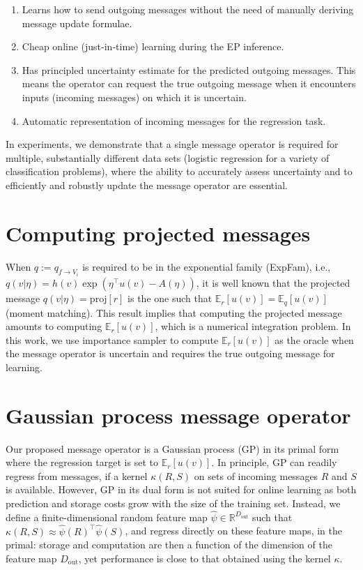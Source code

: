 \documentclass[a4paper,10pt]{article}
\begin{document}
\begin{enumerate}
    \item Learns how to send outgoing messages without the need of manually
        deriving message update formulae.
    \item Cheap online (just-in-time) learning during the EP inference.
    \item Has principled uncertainty estimate for the predicted outgoing
    messages.  This means the operator can request the true outgoing message
when it encounters inputs (incoming messages) on which it is uncertain.  
    \item Automatic representation of incoming messages for the regression task.
\end{enumerate}

In experiments, we demonstrate that a single message operator is required for
multiple, substantially different data sets (logistic regression for a variety
of classification problems), where the ability to accurately assess uncertainty
and to efficiently and robustly update the message operator are essential.

\section{Computing projected messages}
When $q := q_{f \rightarrow V_i}$ is  required to be in the exponential family
(ExpFam), i.e., $q(v|\eta) = h(v)\exp(\eta^\top u(v) - A(\eta))$, 
it is well known that the projected message $q(v|\eta) = \mathrm{proj}[r]$ is
the one such that $\mathbb{E}_r[u(v)] = \mathbb{E}_q[u(v)]$ (moment matching).
This result implies that computing the projected message amounts to computing
$\mathbb{E}_r[u(v)]$, which is a numerical integration problem. In this work,
we use importance sampler to compute $\mathbb{E}_r[u(v)]$ as the oracle when 
the message operator is uncertain and requires the true outgoing message for 
learning. 


\section{Gaussian process message operator}
Our proposed message operator is a Gaussian process (GP) in its primal form
 where the regression target is set to $\mathbb{E}_r[u(v)]$. In
principle, GP can readily regress from messages, if a kernel
$\kappa(R, S)$ on sets of incoming messages $R$ and $S$ is available. However,
GP in its dual form is not suited for online learning as both prediction and storage 
costs grow with the size of the training set. 
Instead, we define 
a finite-dimensional random feature map $\hat{\psi} \in \mathbb{R}^{D_\mathrm{out}}$ such that 
$\kappa(R, S) \approx \hat{\psi}(R)^\top \hat{\psi}(S)$, 
and regress directly on these feature maps, in the primal: storage and computation 
are then a function of the dimension of the feature map $D_\mathrm{out}$, yet
performance is close to that obtained using the kernel $\kappa$.
\end{document}
